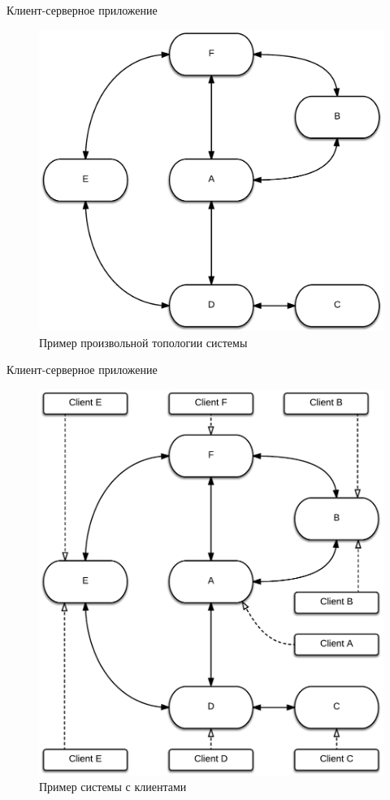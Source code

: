 \documentclass{beamer}
\begin{document}
\begin{frame}[fragile]{Клиент-серверное приложение}
	\begin{figure}
		\includegraphics[scale=0.18]{img/example.png}
		\caption{Пример произвольной топологии системы}
	\end{figure}
\end{frame}
	
\begin{frame}[fragile]{Клиент-серверное приложение}
	\begin{figure}
		\includegraphics[scale=0.14]{img/client_ex.png}
		\caption{Пример системы с клиентами}
	\end{figure}
\end{frame}
\end{document}
